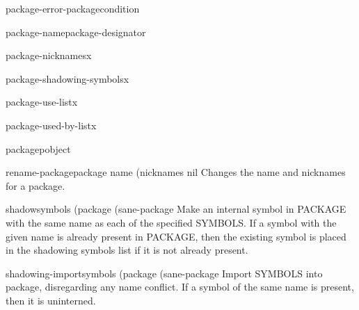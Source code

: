 \begin{function}{package-error-package}{condition}{}
  
\end{function}

\begin{function}{package-name}{package-designator}{}
  
\end{function}

\begin{function}{package-nicknames}{x}{}
  
\end{function}

\begin{function}{package-shadowing-symbols}{x}{}
  
\end{function}

\begin{function}{package-use-list}{x}{}
  
\end{function}

\begin{function}{package-used-by-list}{x}{}
  
\end{function}

\begin{function}{packagep}{object}{}
  
\end{function}

\begin{function}{rename-package}{package name \op (nicknames nil}{}
  Changes the name and nicknames for a package.
\end{function}

\begin{function}{shadow}{symbols \op (package (sane-package}{}
  Make an internal symbol in PACKAGE with the same name as each of the
specified SYMBOLS. If a symbol with the given name is already present in
PACKAGE, then the existing symbol is placed in the shadowing symbols list if
it is not already present.
\end{function}

\begin{function}{shadowing-import}{symbols \op (package (sane-package}{}
  Import SYMBOLS into package, disregarding any name conflict. If
  a symbol of the same name is present, then it is uninterned.
\end{function}

